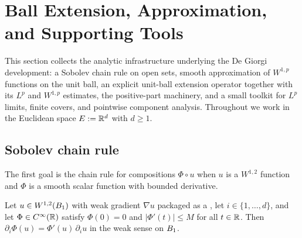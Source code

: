 \chapter{Ball Extension, Approximation, and Supporting Tools}\label{sec:extension}


This section collects the analytic infrastructure underlying the De Giorgi
development: a Sobolev chain rule on open sets, smooth approximation of
$W^{1,p}$ functions on the unit ball, an explicit unit-ball extension operator
together with its $L^p$ and $W^{1,p}$ estimates, the positive-part machinery,
and a small toolkit for $L^p$ limits, finite covers, and pointwise component
analysis. Throughout we work in the Euclidean space $E := \mathbb{R}^d$ with $d \ge 1$.

\section{Sobolev chain rule}

The first goal is the chain rule for compositions $\Phi \circ u$ when $u$ is a
$W^{1,2}$ function and $\Phi$ is a smooth scalar function with bounded
derivative.

\begin{theorem}
\label{thm:chain-rule-unitBall}
\leanok
{}
Let $u \in W^{1,2}(B_{1})$ with weak gradient $\nabla u$ packaged as a
, let $i \in \{1,\dots,d\}$, and let $\Phi \in
C^{\infty}(\mathbb{R})$ satisfy $\Phi(0)=0$ and $|\Phi'(t)| \le M$ for all $t \in \mathbb{R}$.
Then $\partial_i \Phi(u) = \Phi'(u)\,\partial_i u$ in the weak sense on
$B_{1}$.
\end{theorem}


